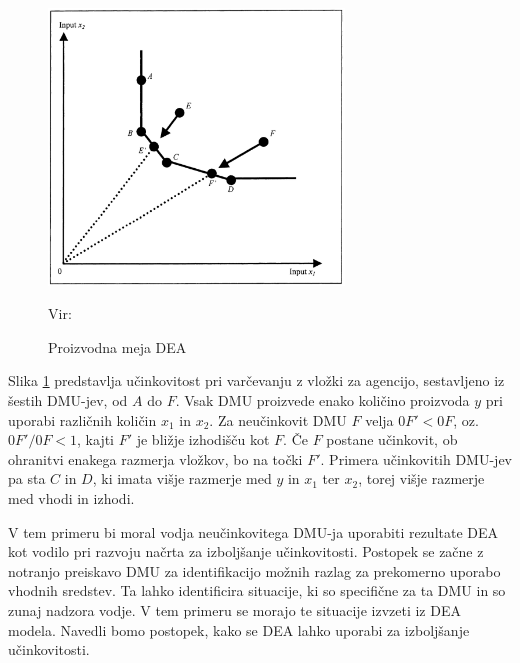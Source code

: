 \documentclass[12pt,a4paper]{article}
\theoremstyle{definition}
\begin{document}
\begin{figure}[htbp]
    \centering
    \includegraphics[width=0.7\textwidth]{dea_frontier.png}
    \caption{Proizvodna meja DEA}
    \label{fig:dea_frontier}
    \vspace{0.2em}
    \footnotesize{Vir: \cite{Lovell2002}}
\end{figure}

Slika \ref{fig:dea_frontier} predstavlja učinkovitost pri 
varčevanju z vložki za agencijo, sestavljeno iz šestih
DMU-jev, od $A$ do $F$. Vsak DMU proizvede enako količino
proizvoda $y$ pri uporabi različnih količin $x_1$ in $x_2$.
Za neučinkovit DMU $F$ velja $0F' < 0F$, oz.\ $0F'/0F < 1$,
kajti $F'$ je bližje izhodišču kot $F$. Če $F$ postane 
učinkovit, ob ohranitvi enakega razmerja vložkov, bo
na točki $F'$. Primera učinkovitih DMU-jev pa sta $C$
in $D$, ki imata višje razmerje med $y$ in $x_1$ ter
$x_2$, torej višje razmerje med vhodi in izhodi.

V tem primeru bi moral vodja neučinkovitega DMU-ja uporabiti
rezultate DEA kot vodilo pri razvoju načrta za izboljšanje
učinkovitosti. Postopek se začne z notranjo preiskavo DMU
za identifikacijo možnih razlag za prekomerno uporabo vhodnih sredstev.
Ta lahko identificira situacije, ki so specifične za ta DMU
in so zunaj nadzora vodje. V tem primeru se morajo te situacije
izvzeti iz DEA modela. Navedli bomo postopek, kako se DEA
lahko uporabi za izboljšanje učinkovitosti. \cite{Yaisawarng2002}
\end{document}

